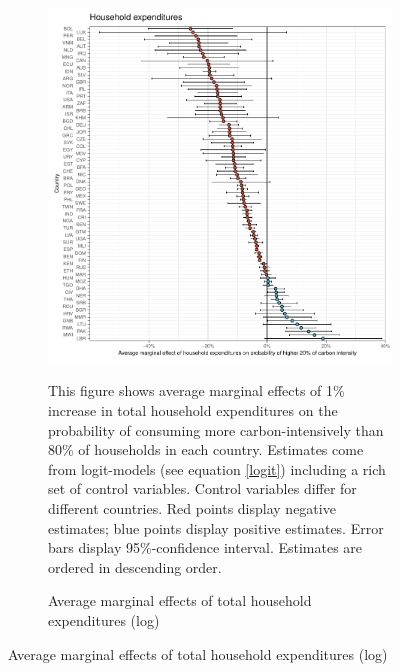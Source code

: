 \begin{figure}[ht!]
  \centering
  \caption{Average marginal effects (logit-models)}\label{fig:Logit_ME}
  \begin{subfigure}[b]{\textwidth}
  \centering
  \caption{Average marginal effects of total household expenditures (log)} \label{fig:Logit_ME_exp}
  \includegraphics{1_Figures/Analysis_Logit_Models_Marginal_Effects/Average_Marginal_Effects_affected_upper_80_log_hh_expenditures_USD_2014_2017B.pdf}
  \begin{subcaption2}
     This figure shows average marginal effects of 1\% increase in total household expenditures on the probability of consuming more carbon-intensively than 80\% of households in each country. Estimates come from logit-models (see equation \ref{logit}) including a rich set of control variables. Control variables differ for different countries. Red points display negative estimates; blue points display positive estimates. Error bars display 95\%-confidence interval. Estimates are ordered in descending order.
  \end{subcaption2}
  \end{subfigure}
 \end{figure}
 \clearpage

